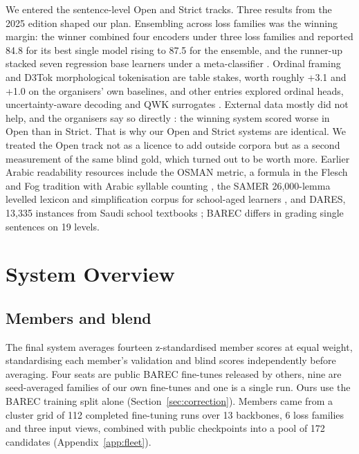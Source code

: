\documentclass[11pt]{article}
\begin{document}
We entered the sentence-level Open and Strict tracks. Three results from the 2025 edition
shaped our plan. Ensembling across loss families was the winning margin: the winner
\citep{basem-etal-2025-msa} combined four encoders under three loss families and reported 84.8
for its best single model rising to 87.5 for the ensemble, and the runner-up stacked seven
regression base learners under a meta-classifier \citep{saeed-etal-2025-amar}. Ordinal framing and D3Tok morphological tokenisation are table
stakes, worth roughly +3.1 and +1.0 on the organisers' own baselines, and other entries
explored ordinal heads, uncertainty-aware decoding and QWK surrogates
\citep{nazzal-2025-zai,abdou-2025-mucai,trigui-2025-stbw,eldin-2025-morphoarabia}. External
data mostly did not help, and the organisers say so directly
\citep{elmadani-etal-2025-barec-shared-task}: the winning system scored worse in Open than in
Strict. That is why our Open and Strict systems are identical. We treated the Open track not as
a licence to add outside corpora but as a second measurement of the same blind gold, which
turned out to be worth more. Earlier Arabic readability resources include the OSMAN metric,
a formula in the Flesch and Fog tradition with Arabic syllable counting
\citep{el-haj-rayson-2016-osman}, the SAMER 26,000-lemma levelled lexicon and simplification
corpus for school-aged learners \citep{al-khalil-etal-2020-large,alhafni-etal-2024-samer},
and DARES, 13,335 instances from Saudi school textbooks \citep{el-haj-etal-2024-dares};
BAREC differs in grading single sentences on 19 levels.

\section{System Overview}
\label{sec:system}

\subsection{Members and blend}

The final system averages fourteen z-standardised member scores at equal weight,
standardising each member's validation and blind scores independently before averaging. Four
seats are public BAREC fine-tunes released by others, nine are seed-averaged families of our
own fine-tunes and one is a single run. Ours use the BAREC training split alone
(Section~\ref{sec:correction}). Members came from a cluster grid of 112 completed
fine-tuning runs over 13 backbones, 6 loss families and three input views, combined with
public checkpoints into a pool of 172 candidates (Appendix~\ref{app:fleet}).
\end{document}

